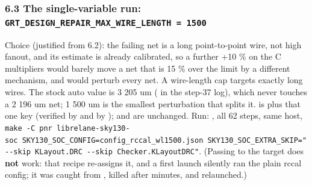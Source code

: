 \subsubsection{\texorpdfstring{6.3 The single-variable run:
\texttt{GRT\_\allowbreak{}DESIGN\_\allowbreak{}REPAIR\_\allowbreak{}MAX\_\allowbreak{}WIRE\_\allowbreak{}LENGTH\ =\allowbreak{}\ 1500}}{6.3 The single-variable run: }}\label{cr:defect:sky130-slew-cap-e45j:63-the-single-variable-run-grt-design-repair-max-wire-length-1500}

\begin{record}

Choice (justified from 6.2): the failing net is a long point-to-point
wire, not high fanout, and its estimate is already calibrated, so a
further +10 \% on the C multipliers would barely move a net that is 15
\% over the limit by a different mechanism, and would perturb every net.
A wire-length cap targets exactly long wires. The stock auto value is 3
205 um ( in the step-37 log), which never touches a 2 196
um net; 1 500 um is the smallest perturbation that splits it.
 is  plus that
one key (verified by  and by );
 and  are unchanged. Run:
, all 62 steps, same host,
\texttt{make\ -\allowbreak{}C\ pnr\ librelane-\allowbreak{}sky130-\allowbreak{}soc\ SKY130\_\allowbreak{}SOC\_\allowbreak{}CONFIG=\allowbreak{}config\_\allowbreak{}rccal\_\allowbreak{}wl1500.\allowbreak{}json\ SKY130\_\allowbreak{}SOC\_\allowbreak{}EXTRA\_\allowbreak{}SKIP=\allowbreak{}"-\allowbreak{}-\allowbreak{}skip\ KLayout.\allowbreak{}DRC\ -\allowbreak{}-\allowbreak{}skip\ Checker.\allowbreak{}KLayoutDRC"}.
(Passing  to the  target
does \textbf{not} work: that recipe re-assigns it, and a first launch
silently ran the plain rccal config; it was caught from
, killed after minutes, and relaunched.)

{\footnotesize\setlength{\tabcolsep}{3pt}

}
\end{record}
